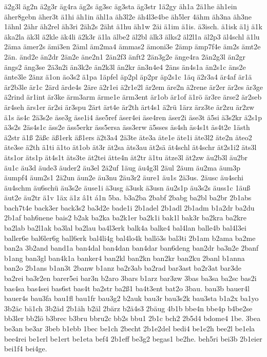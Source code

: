 {ä2g3l
äg2n
ä2g3r
äg4ra
äg2s
äg3sc
äg3sta
äg3str
1ä2gy
äh1a
2ä1he
äh1ein
äher8gebn
äher3t
ä1hi
äh1in
ähl1a
äh3l2e
äh4l3e4be
äh5ler
4ähm
äh3na
äh3ne
1ähnl
2ähr
äh2rel
äh3ri
2äh2s
2äht
ä1hu
äh1w
2äi
ä1im
ä1is.
ä3isch.
ä1isk
ä1j
ä1k
äka2la
äk3l
ä2kle
äk4li
ä2k3r
ä1la
älbe2
äl2bl
älk3
älks2
äl2l1a
äl2p3
äl4schl
ä1lu
2äma
ämer2s
ämi3en
2äml
äm2ma4
ämmas2
ämoni3e
2ämp
ämp7f4e
äm2s
ämt2e
2än.
änd2e
än2dr
2än2e
äne2n1
2än2f3
änft2
2än3g2e
änge4ra
2än2g3l
än2gr
ängs2
äng3se
2ä3n2i
än3k2e
än2k3l
än2kr
än3n4e4
2äns
än4s1a
än2s1c
äns2e
änte3le
2änz
ä1on
äo3s2
ä1pa
1äpfel
äp2pl
äp2pr
äp2s1c
1äq
ä2r3a4
är4af
är1ä
är2b3le
är1c
2ärd
ärde4s
2äre
ä2r1ei
ä2r1e2l
är2em
äre2n
ä2rene
är2er
är2es
är3ge
ä2rind
är1int
är3ke
ärm3arm
ärme1e
ärm3ent
är1ob
är1of
ä1rö
är3re
ärse2
är2seb
är4seh
ärs1er
är2si
är3spu
2ärt
ärt4e
är2th
ärt4s1
ä2rü
1ärz
ärz3te
är2zu
är2zw
ä1s
äs4c
2ä3s2e
äse3g
äse1i4
äse5ref
äser4ei
äse4ren
äser2i
äse3t
ä5si
ä3s2kr
ä2s1p
ä3s2s
2äs4s1c
äss2e
äss5erkr
äss5ersa
äss3erw
ä5sses
äs4sh
äs4s1t
äs4t2e
1ästh
ä2str
ä1ß
2äßc
äß1erk
äß1ers
ä2t3a4
2ä3te
äte3a
äte1e
äte1i
äte3l2
äte2n
äteo2
äte3se
ä2th
ä1ti
ä1to
ät1ob
ät3r
ät2sa
äts3au
ät2sä
ät4schl
ät4schr
ät2s1i2
äts3l
äts1or
äts1p
ät4s1t
äts3te
ät2tei
ätte4n
ät2tr
ä1tu
ätze3l
ät2zw
äu2b3l
äu2br
äu1c
äu3d
äude3
äuder2
äu3el
2ä2uf
1äug
äu4g3l
2äul
2äum
äu2ma
äum3p
äumpf4
äum2s1
2ä2un
äun2e
äu3nu
2äu3r2
äure1
äu1s
2ä3us.
2äusc
äu4schi
äu4schm
äu6schü
äu3s2e
äuse1i
ä3usg
ä3usk
ä3usn
äu2s1p
äu3s2s
äuss1c
1äuß
äut2e
äu2tr
ä1v
1äx
ä1z
â1t
á1n
5ba.
b3a2ba
2babf
2babg
ba2bl
ba2br
2b1abs
bach7t4e
back3er
back3s2
ba3d2e
bade1i
2b1adel
2b1adl
2b1adm
b1a2dr
ba2du
2b1af
bah6nene
bais2
b2ak
ba2ka
ba2k1er
ba2k1i
bak1l
bak3r
ba2kra
ba2kre
ba2lab
ba2l1ak
ba3lal
ba2lau
ba4l3erk
balk4a
balke4
bal4lan
balle4b
bal4l3ei
baller6e
bal6ler6g
ball6erk
bal4li4g
bal4lo4k
ballö3s
bal3ti
2b1am
b2ama
ba2me
ban2a
3b2and
band1a
ban4dal
ban4dan
ban4dar
ban6deng
ban2dr
ba3n2e
2banf
b1ang
ban3gl
ban4k1a
banker4
ban2kl
ban2kn
ban2kr
ban2ku
2banl
b1anna
ban2o
2b1ans
b1an3t
2banw
b1anz
ba2r3ab
ba2rad
bar3ast
ba2r3at
bar3de
ba2rei
ba3r2en
barer5ei
bar3n
b2aro
3bars
b1arz
bar3zw
3bas
ba3sa
ba2sc
bas2i
bas4sa
bas4sei
bas6st
bas4t
ba2str
ba2ß1
ba4t3ent
bat2o
3bau.
bau3b
bauer4l
bauer4s
bau3fa
bau1fl
bau1fr
bau3g2
b2auk
bau3r
bau3s2k
bau3sta
b1a2x
ba1yo
3b2äc
bä1ch
3b2äd
2b1äh
b2äl
2bärz
b2ä4s3
2bäug
4b1b
bbe4n
bbe4p
b4be2se
bb3ler
bb2lö
b3brec
b3bru
bbru2c
bb2s
bbu1
2b1c
bch2
2b5d4
bdome4
1be.
3bea
be3an
be3ar
3beb
b1ebb
1bec
be1ch
2becht
2b1e2del
bedi4
be1e2h
bee2l
be1ela
bee4rei
be1erl
be1ert
be1eta
bef4
2b1eff
be3g2
begas1
be2he.
beh5ri
bei3b
2b1eier
bei1f4
bei4ge.
}
